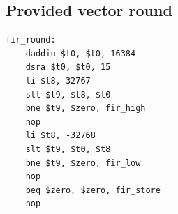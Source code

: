 \subsection{Provided vector round}
\begin{verbatim}
fir_round:
    daddiu $t0, $t0, 16384
    dsra $t0, $t0, 15
    li $t8, 32767
    slt $t9, $t8, $t0
    bne $t9, $zero, fir_high
    nop
    li $t8, -32768
    slt $t9, $t0, $t8
    bne $t9, $zero, fir_low
    nop
    beq $zero, $zero, fir_store
    nop
\end{verbatim}
